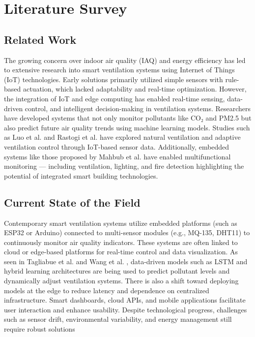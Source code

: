 \chapter{Literature Survey}

\section{Related Work}  
The growing concern over indoor air quality (IAQ) and energy efficiency has led to extensive research into smart ventilation systems using Internet of Things (IoT) technologies. Early solutions primarily utilized simple sensors with rule-based actuation, which lacked adaptability and real-time optimization. However, the integration of IoT and edge computing has enabled real-time sensing, data-driven control, and intelligent decision-making in ventilation systems. Researchers have developed systems that not only monitor pollutants like CO₂ and PM2.5 but also predict future air quality trends using machine learning models. Studies such as Luo et al. \cite{1} and Rastogi et al.\cite{2} have explored natural ventilation and adaptive ventilation control through IoT-based sensor data. Additionally, embedded systems like those proposed by Mahbub et al. \cite{3} have enabled multifunctional monitoring — including ventilation, lighting, and fire detection highlighting the potential of integrated smart building technologies.

\section{Current State of the Field}  
Contemporary smart ventilation systems utilize embedded platforms (such as ESP32 or Arduino) connected to multi-sensor modules (e.g., MQ-135, DHT11) to continuously monitor air quality indicators. These systems are often linked to cloud or edge-based platforms for real-time control and data visualization. As seen in Tagliabue et al.\cite{4} and Wang et al. \cite{5}, data-driven models such as LSTM and hybrid learning architectures are being used to predict pollutant levels and dynamically adjust ventilation systems. There is also a shift toward deploying models at the edge to reduce latency and dependence on centralized infrastructure. Smart dashboards, cloud APIs, and mobile applications facilitate user interaction and enhance usability. Despite technological progress, challenges such as sensor drift, environmental variability, and energy management still require robust solutions
